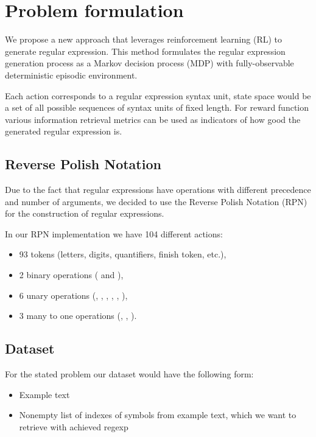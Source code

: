 \documentclass{article}
\begin{document}
\section{Problem formulation}

We propose a new approach that leverages reinforcement learning (RL) to generate regular expression.
This method formulates the regular expression generation process as a Markov decision process (MDP)
with fully-observable deterministic episodic environment.

Each action corresponds to a regular expression syntax unit, state space would be a set of all possible sequences
of syntax units of fixed length. For reward function various information retrieval metrics can be used as indicators
of how good the generated regular expression is.

\subsection{Reverse Polish Notation}
Due to the fact that regular expressions have operations with different precedence and number of arguments,
we decided to use the Reverse Polish Notation (RPN) for the construction of regular expressions.

In our RPN implementation we have 104 different actions:
\begin{itemize}
  \item 93 tokens (letters, digits, quantifiers, finish token, etc.),
  \item 2 binary operations ( and \codeword{|}),
  \item 6 unary operations (\codeword{*}, \codeword{+}, , , , ),
  \item 3 many to one operations (\codeword{[]}, \codeword{\^[]}, ).
\end{itemize}

\subsection{Dataset}

For the stated problem our dataset would have the following form:
\begin{itemize}
  \item Example text
  \item Nonempty list of indexes of symbols from example text, which we want to retrieve with achieved regexp
\end{itemize}
\end{document}
